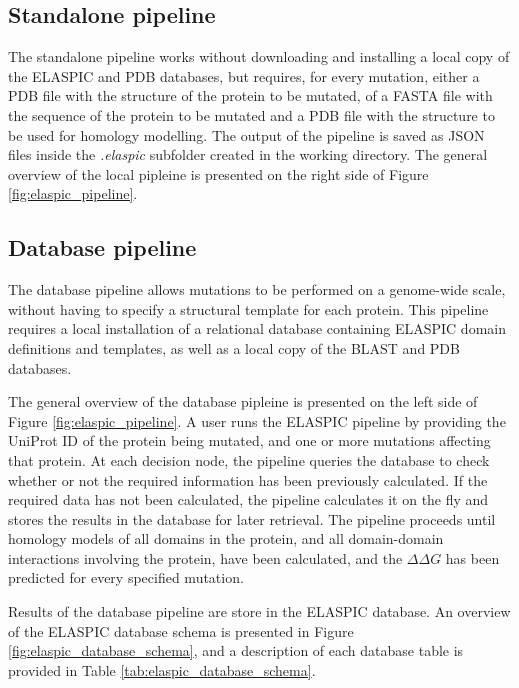 \subsection{Standalone pipeline} \label{sec:standalone_pipeline}

The standalone pipeline works without downloading and installing a local copy of the ELASPIC and PDB databases, but requires, for every mutation, either a PDB file with the structure of the protein to be mutated, of a FASTA file with the sequence of the protein to be mutated and a PDB file with the structure to be used for homology modelling. The output of the pipeline is saved as JSON files inside the \textit{.elaspic} subfolder created in the working directory. The general overview of the local pipleine is presented on the right side of Figure \ref{fig:elaspic_pipeline}.


\subsection{Database pipeline} \label{sec:database_pipeline}

The database pipeline allows mutations to be performed on a genome-wide scale, without having to specify a structural template for each protein. This pipeline requires a local installation of a relational database containing ELASPIC domain definitions and templates, as well as a local copy of the BLAST and PDB databases.

The general overview of the database pipleine is presented on the left side of Figure \ref{fig:elaspic_pipeline}. A user runs the ELASPIC pipeline by providing the UniProt ID of the protein being mutated, and one or more mutations affecting that protein. At each decision node, the pipeline queries the database to check whether or not the required information has been previously calculated. If the required data has not been calculated, the pipeline calculates it on the fly and stores the results in the database for later retrieval. The pipeline proceeds until homology models of all domains in the protein, and all domain-domain interactions involving the protein, have been calculated, and the $\Delta \Delta G$ has been predicted for every specified mutation.

Results of the database pipeline are store in the ELASPIC database. An overview of the ELASPIC database schema is presented in Figure \ref{fig:elaspic_database_schema}, and a description of each database table is provided in Table \ref{tab:elaspic_database_schema}.

